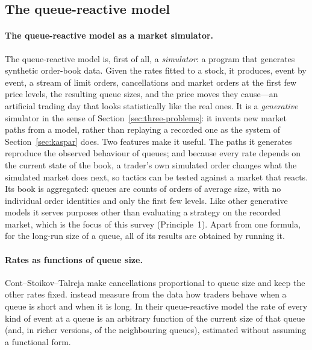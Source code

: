 \subsection{The queue-reactive model}
\label{sec:qr}

\paragraph{The queue-reactive model as a market simulator.} The queue-reactive model is, first of all, a
\emph{simulator}: a program that generates synthetic order-book data. Given the rates fitted to a stock, it
produces, event by event, a stream of limit orders, cancellations and market orders at the first few price
levels, the resulting queue sizes, and the price moves they cause---an artificial trading day that
looks statistically like the real ones. It is a \emph{generative} simulator in the sense of
Section~\ref{sec:three-problems}: it invents new market paths from a model, rather than replaying a
recorded one as the \kasparhft{} system of Section~\ref{sec:kaspar} does. Two features make it useful. The paths it generates
reproduce the observed behaviour of queues; and because every rate depends on the current state of the
book, a trader's own simulated order changes what the simulated market does next, so tactics can be
tested against a market that reacts. Its book is aggregated: queues are counts of orders of average
size, with no individual order identities and only the first few levels. Like other generative models it
serves purposes other than evaluating a strategy on the recorded market, which is the focus of this
survey (Principle~1). Apart from one formula, for the long-run
size of a queue, all of its results are obtained by running it.

\paragraph{Rates as functions of queue size.} Cont--Stoikov--Talreja make cancellations proportional to
queue size and keep the other rates fixed. \citet{huang2015} instead measure from the data how traders
behave when a queue is short and when it is long. In their queue-reactive model the rate of every kind of
event at a queue is an arbitrary function of the current size of that queue (and, in richer versions, of
the neighbouring queues), estimated without assuming a functional form.

